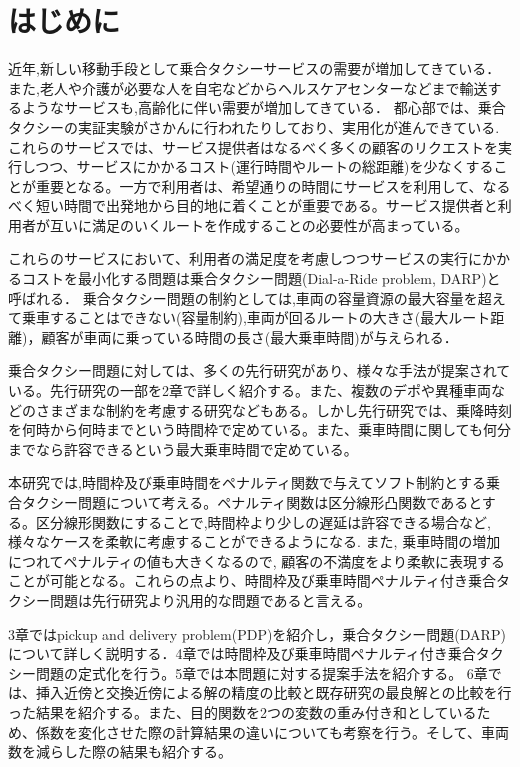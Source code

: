 \chapter{はじめに}
近年,新しい移動手段として乗合タクシーサービスの需要が増加してきている．また,老人や介護が必要な人を自宅などからヘルスケアセンターなどまで輸送するようなサービスも,高齢化に伴い需要が増加してきている．
都心部では、乗合タクシーの実証実験がさかんに行われたりしており、実用化が進んできている. これらのサービスでは、サービス提供者はなるべく多くの顧客のリクエストを実行しつつ、サービスにかかるコスト(運行時間やルートの総距離)を少なくすることが重要となる。一方で利用者は、希望通りの時間にサービスを利用して、なるべく短い時間で出発地から目的地に着くことが重要である。サービス提供者と利用者が互いに満足のいくルートを作成することの必要性が高まっている。

これらのサービスにおいて、利用者の満足度を考慮しつつサービスの実行にかかるコストを最小化する問題は乗合タクシー問題(Dial-a-Ride problem, DARP)と呼ばれる．
乗合タクシー問題の制約としては,車両の容量資源の最大容量を超えて乗車することはできない(容量制約),車両が回るルートの大きさ(最大ルート距離)，顧客が車両に乗っている時間の長さ(最大乗車時間)が与えられる．

乗合タクシー問題に対しては、多くの先行研究があり、様々な手法が提案されている。先行研究の一部を2章で詳しく紹介する。また、複数のデポや異種車両などのさまざまな制約を考慮する研究などもある。しかし先行研究では、乗降時刻を何時から何時までという時間枠で定めている。また、乗車時間に関しても何分までなら許容できるという最大乗車時間で定めている。

本研究では,時間枠及び乗車時間をペナルティ関数で与えてソフト制約とする乗合タクシー問題について考える。ペナルティ関数は区分線形凸関数であるとする。区分線形関数にすることで,時間枠より少しの遅延は許容できる場合など,様々なケースを柔軟に考慮することができるようになる. また, 乗車時間の増加につれてペナルティの値も大きくなるので, 顧客の不満度をより柔軟に表現することが可能となる。これらの点より、時間枠及び乗車時間ペナルティ付き乗合タクシー問題は先行研究より汎用的な問題であると言える。

3章ではpickup and delivery problem(PDP)を紹介し，乗合タクシー問題(DARP)について詳しく説明する．4章では時間枠及び乗車時間ペナルティ付き乗合タクシー問題の定式化を行う。5章では本問題に対する提案手法を紹介する。
6章では、挿入近傍と交換近傍による解の精度の比較と既存研究の最良解との比較を行った結果を紹介する。また、目的関数を2つの変数の重み付き和としているため、係数を変化させた際の計算結果の違いについても考察を行う。そして、車両数を減らした際の結果も紹介する。
